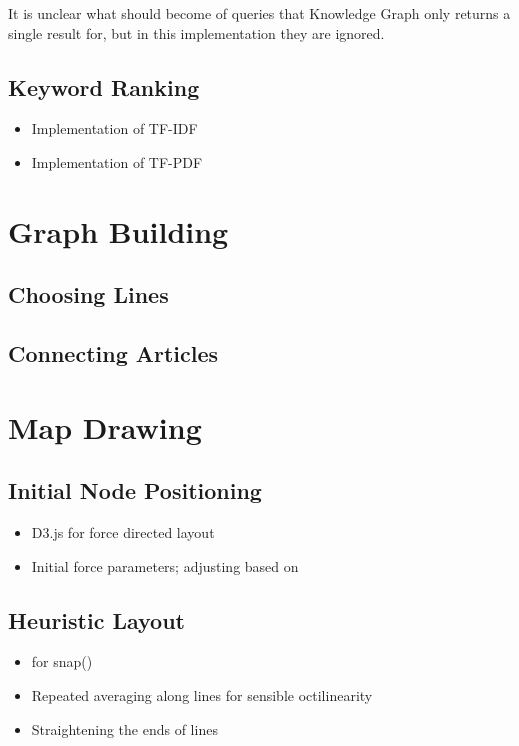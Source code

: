 It is unclear what should become of queries that Knowledge Graph only returns a single result for, but in this implementation they are ignored.


\subsection{Keyword Ranking}



\begin{itemize}[noitemsep]
	\item Implementation of TF-IDF
	\item Implementation of TF-PDF
\end{itemize}

\section{Graph Building}

\subsection{Choosing Lines}

\subsection{Connecting Articles}

\section{Map Drawing}

\subsection{Initial Node Positioning}
\begin{itemize}[noitemsep]
	\item D3.js for force directed layout
	\item Initial force parameters; adjusting based on \cite{AutomaticMetroMapLayoutThesis, AutomaticMetroMapLayout}
\end{itemize}

\subsection{Heuristic Layout}
\begin{itemize}[noitemsep]
	\item \cite{AutomaticMetroMapLayoutThesis, AutomaticMetroMapLayout} for snap()
	\item Repeated averaging along lines for sensible octilinearity
	\item Straightening the ends of lines
\end{itemize}
